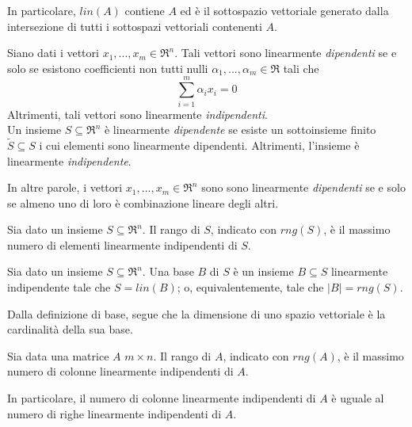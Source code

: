 In particolare, $lin(A)$ contiene $A$ ed è il sottospazio vettoriale generato dalla intersezione di tutti i sottospazi vettoriali contenenti $A$.

\begin{definition}
	\label{dfn:linear-dependence}
	Siano dati i vettori $x_{1},...,x_{m}\in\Re^{n}$. Tali vettori sono linearmente \textit{dipendenti} se e solo se esistono coefficienti non tutti nulli $\alpha_{1},...,\alpha_{m}\in\Re$ tali che
	\begin{equation}
	\label{eqn:linear-dependence}
	\sum_{i=1}^{m}\alpha_{i}x_{i}=0
	\end{equation}
	Altrimenti, tali vettori sono linearmente \textit{indipendenti}.
	\\
	Un insieme $S\subseteq\Re^{n}$ è linearmente \textit{dipendente} se esiste un sottoinsieme finito $\tilde{S}\subseteq S$ i cui elementi sono linearmente dipendenti. Altrimenti, l'insieme è linearmente \textit{indipendente}.
\end{definition}

In altre parole, i vettori $x_{1},...,x_{m}\in\Re^{n}$ sono sono linearmente \textit{dipendenti} se e solo se almeno uno di loro è combinazione lineare degli altri.

\begin{definition}
	\label{dfn:range-set}
	Sia dato un insieme $S\subseteq\Re^{n}$. Il rango di $S$, indicato con $rng(S)$, è il massimo numero di elementi linearmente indipendenti di $S$.
\end{definition}

\begin{definition}
	\label{dfn:base}
	Sia dato un insieme $S\subseteq\Re^{n}$. Una base $B$ di $S$ è un insieme $B\subseteq S$ linearmente indipendente tale che $S=lin(B)$; o, equivalentemente, tale che $|B|=rng(S)$.
\end{definition}

Dalla definizione di base, segue che la dimensione di uno spazio vettoriale è la cardinalità della sua base.

\begin{definition}
	\label{dfn:range-matrix}
	Sia data una matrice $A$ $m\times n$. Il rango di $A$, indicato con $rng(A)$, è il massimo numero di colonne linearmente indipendenti di $A$.
\end{definition}

In particolare, il numero di colonne linearmente indipendenti di $A$ è uguale al numero di righe linearmente indipendenti di $A$.

